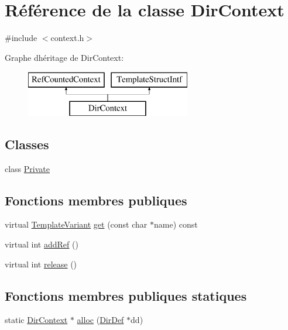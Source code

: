 \hypertarget{class_dir_context}{}\section{Référence de la classe Dir\+Context}
\label{class_dir_context}


{\ttfamily \#include $<$context.\+h$>$}

Graphe d\textquotesingle{}héritage de Dir\+Context\+:\begin{figure}[H]
\begin{center}
\leavevmode
\includegraphics[height=2.000000cm]{class_dir_context}
\end{center}
\end{figure}
\subsection*{Classes}
\begin{DoxyCompactItemize}
\item 
class \hyperlink{class_dir_context_1_1_private}{Private}
\end{DoxyCompactItemize}
\subsection*{Fonctions membres publiques}
\begin{DoxyCompactItemize}
\item 
virtual \hyperlink{class_template_variant}{Template\+Variant} \hyperlink{class_dir_context_ac764904404936eec2109d419a9c38492}{get} (const char $\ast$name) const 
\item 
virtual int \hyperlink{class_dir_context_aed347462a6216f09bf1ca609e1cc9c1a}{add\+Ref} ()
\item 
virtual int \hyperlink{class_dir_context_aa32fa4e75b13432c9dc8d42d5e8d6cad}{release} ()
\end{DoxyCompactItemize}
\subsection*{Fonctions membres publiques statiques}
\begin{DoxyCompactItemize}
\item 
static \hyperlink{class_dir_context}{Dir\+Context} $\ast$ \hyperlink{class_dir_context_af45e135e3ee37b65c81823b610253f82}{alloc} (\hyperlink{class_dir_def}{Dir\+Def} $\ast$dd)
\end{DoxyCompactItemize}


